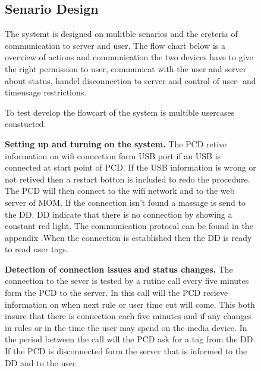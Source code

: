 \begin{figure}[h]
\subsection{Senario Design}

The systemt is designed on mulitble senarios and the creteria of communication to server and user. The flow chart below is a overview of actions and communication the two devices have to give the right permission to user, communicat with the user and server about status, handel disconnection to server and control of user- and timeusage restrictions.\newline


To test develop the flowcart of the system is multible usercases constucted.\newline


\textbf{Setting up and turning on the system.} \newline
The PCD retive information on wifi connection form USB port if an USB is connected at start point of PCD. 
If the USB information is wrong or not retived then a restart botton is included to redo the procedure.  \newline
The PCD will then connect to the wifi network and to the web server of MOM. If the connection isn't found a massage is send to the DD. \newline DD indicate that there is no connection by showing a constant red light. The communication protocal can be found in the appendix  .\newline When the connection is established then the DD is ready to read user tags.\newline

\textbf{Detection of connection issues and status changes.} \newline
The connection to the sever is tested by a rutine call every five minutes form the PCD to the server. In this call will the PCD recieve information on when next rule or user time cut will come. This both insure that there is connection each five minutes and if any changes in rules or in the time the user may spend on the media device. In the period between the call will the PCD ask for a tag from the DD. If the PCD is disconnected form the server that is informed to the DD and to the user.  \newline
	

\end{figure}
